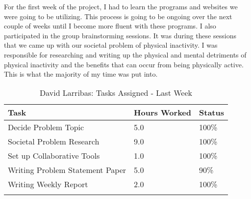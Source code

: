 \documentclass[12pt,article,compsoc]{IEEEtran}
\begin{document}
	For the first week of the project, I had to learn the programs and websites we were going to be utilizing. This process is going to be ongoing over the next couple of weeks until I become more fluent with these programs.  I also participated in the group brainstorming sessions.  It was during these sessions that we came up with our societal problem of physical inactivity.  I was responsible for researching and writing up the physical and mental detriments of physical inactivity and the benefits that can occur from being physically active.  This is what the majority of my time was put into.
	\begin{table}[ht]
	\renewcommand{\arraystretch}{1.3}
		\caption{David Larribas: Tasks Assigned - Last Week}
		
		\label{Summary of David Larribas' activities: last week}
		
		\centering
		\begin{tabular}{p{5.5cm}|p{1cm}|p{1cm}}
		\hline
		\bfseries 	Task		 		& \bfseries Hours Worked	& \bfseries Status	\\
		\hline\hline
					Decide Problem Topic						& 5.0						& 100\%				\\	%
					Societal Problem Research					& 9.0						& 100\%				\\	%
					Set up Collaborative Tools					& 1.0						& 100\%				\\
					Writing Problem Statement Paper				& 5.0						& 90\%				\\
					Writing Weekly Report						& 2.0						& 100\%				\\	
		\hlinez
		\end{tabular}
	\end{table}
\end{document}
